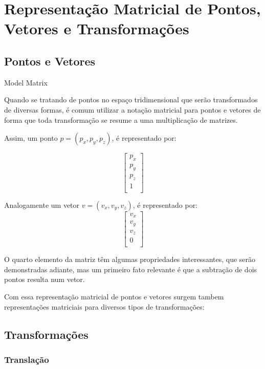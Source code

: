 \chapter{Representação Matricial de Pontos, Vetores e Transformações} %
\label{ape:matrix}
\section{Pontos e Vetores}
Model Matrix

Quando se tratando de pontos no espaço tridimensional que serão transformados de diversas formas, é comum utilizar a notação matricial para pontos e vetores de forma que toda transformação se resume a uma multiplicação de matrizes.

Assim, um ponto $p = (p_x, p_y, p_z)$, é representado por:

\begin{equation}
\begin{bmatrix}
    p_x \\
    p_y \\
    p_z \\
    1 \\
\end{bmatrix}
\end{equation}

Analogamente um vetor $v = (v_x, v_y, v_z)$, é representado por:
\begin{equation}
\begin{bmatrix}
    v_x \\
    v_y \\
    v_z \\
    0 \\
\end{bmatrix}
\end{equation}

O quarto elemento da matriz têm algumas propriedades interessantes, que serão demonstradas adiante, mas um primeiro fato relevante é que a subtração de dois pontos resulta num vetor.

Com essa representação matricial de pontos e vetores surgem tambem representações matriciais para diversos tipos de transformações:


\section{Transformações}
\subsection{Translação}

